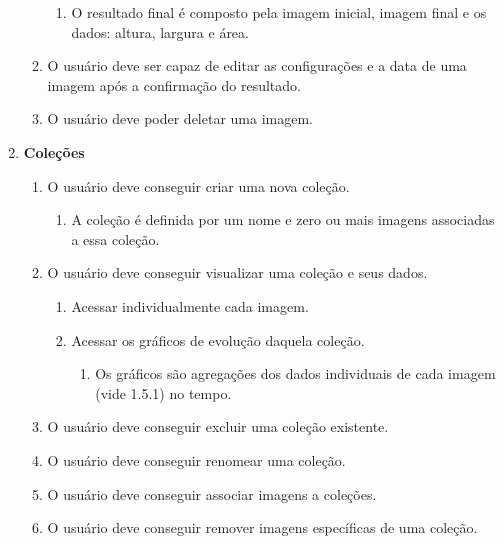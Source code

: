 \begin{enumerate}
\begin{enumerate}
        \begin{enumerate}
            \item O resultado final é composto pela imagem inicial, imagem final e os dados: altura, largura e área.
        \end{enumerate}
        \item O usuário deve ser capaz de editar as configurações e a data de uma imagem após a confirmação do resultado.
        \item O usuário deve poder deletar uma imagem.
    \end{enumerate}
    \item \textbf{Coleções}
    \begin{enumerate}
        \item O usuário deve conseguir criar uma nova coleção.
        \begin{enumerate}
            \item A coleção é definida por um nome e zero ou mais imagens associadas a essa coleção.
        \end{enumerate}
        \item O usuário deve conseguir visualizar uma coleção e seus dados.
        \begin{enumerate}
            \item Acessar individualmente cada imagem.
            \item Acessar os gráficos de evolução daquela coleção.
            \begin{enumerate}
                \item Os gráficos são agregações dos dados individuais de cada imagem (vide 1.5.1) no tempo.
            \end{enumerate}
        \end{enumerate}
        \item O usuário deve conseguir excluir uma coleção existente.
        \item O usuário deve conseguir renomear uma coleção.
        \item O usuário deve conseguir associar imagens a coleções.
        \item O usuário deve conseguir remover imagens específicas de uma coleção.
    \end{enumerate}
\end{enumerate}